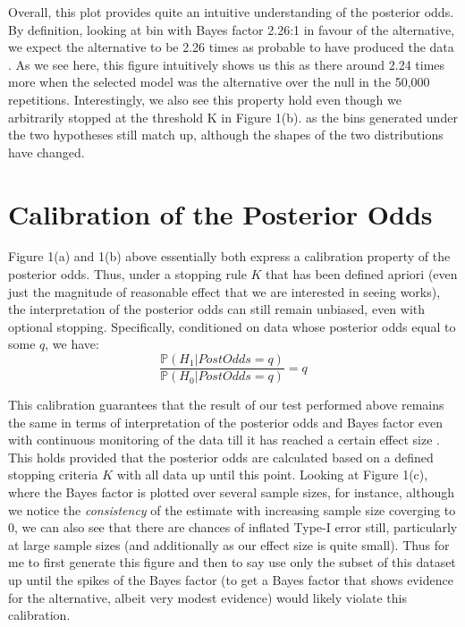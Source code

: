 \documentclass{article}
\begin{document}
Overall, this plot provides quite an intuitive understanding of the posterior odds. By definition, looking at bin with Bayes factor 2.26:1 in favour of the alternative, we expect the alternative to be 2.26 times as probable to have produced the data \cite{rounder}. As we see here, this figure intuitively shows us this as there around 2.24 times more when the selected model was the alternative over the null in the 50,000 repetitions. Interestingly, we also see this property hold even though we arbitrarily stopped at the threshold K in Figure 1(b). as the bins generated under the two hypotheses still match up, although the shapes of the two distributions have changed. 

\section{Calibration of the Posterior Odds}

Figure 1(a) and 1(b) above essentially both express a calibration property of the posterior odds. Thus, under a stopping rule $K$ that has been defined apriori (even just the magnitude of reasonable effect that we are interested in seeing works), the interpretation of the posterior odds can still remain unbiased, even with optional stopping. Specifically, conditioned on data whose posterior odds equal to some $q$, we have: 
\begin{equation}
    \frac{\mathbb{P}(H_1|PostOdds = q)}{\mathbb{P}(H_0|PostOdds = q)} = q
\end{equation}

This calibration guarantees that the result of our test performed above remains the same in terms of interpretation of the posterior odds and Bayes factor even with continuous monitoring of the data till it has reached a certain effect size \cite{deng}. This holds provided that the posterior odds are calculated based on a defined stopping criteria $K$ with all data up until this point. Looking at Figure 1(c), where the Bayes factor is plotted over several sample sizes, for instance, although we notice the \textit{consistency} of the estimate with increasing sample size coverging to 0, we can also see that there are chances of inflated Type-I error still, particularly at large sample sizes (and additionally as our effect size is quite small). Thus for me to first generate this figure and then to say use only the subset of this dataset up until the spikes of the Bayes factor (to get a Bayes factor that shows evidence for the alternative, albeit very modest evidence) would likely violate this calibration. 
\end{document}
